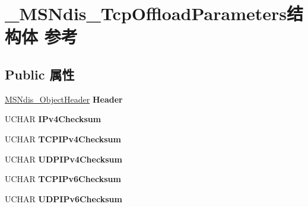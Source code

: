 \hypertarget{struct___m_s_ndis___tcp_offload_parameters}{}\section{\+\_\+\+M\+S\+Ndis\+\_\+\+Tcp\+Offload\+Parameters结构体 参考}
\label{struct___m_s_ndis___tcp_offload_parameters}
\subsection*{Public 属性}
\begin{DoxyCompactItemize}
\item 
\mbox{\label{struct___m_s_ndis___tcp_offload_parameters_a3f03ed32004bb62f56e9cc13d1530537}} 
\hyperlink{struct___m_s_ndis___object_header}{M\+S\+Ndis\+\_\+\+Object\+Header} {\bfseries Header}
\item 
\mbox{\label{struct___m_s_ndis___tcp_offload_parameters_a4287e385a014cc646cd56e17527db5de}} 
U\+C\+H\+AR {\bfseries I\+Pv4\+Checksum}
\item 
\mbox{\label{struct___m_s_ndis___tcp_offload_parameters_ae5c03e345e74ea273ef8cee0c6a07a78}} 
U\+C\+H\+AR {\bfseries T\+C\+P\+I\+Pv4\+Checksum}
\item 
\mbox{\label{struct___m_s_ndis___tcp_offload_parameters_ad1e7b89fd60b825ffa9926c659aa4bd5}} 
U\+C\+H\+AR {\bfseries U\+D\+P\+I\+Pv4\+Checksum}
\item 
\mbox{\label{struct___m_s_ndis___tcp_offload_parameters_a49582dcb34ac82937ec789434b4b35d0}} 
U\+C\+H\+AR {\bfseries T\+C\+P\+I\+Pv6\+Checksum}
\item 
\mbox{\label{struct___m_s_ndis___tcp_offload_parameters_a06052cbf4eed251141af3aac36dda10e}} 
U\+C\+H\+AR {\bfseries U\+D\+P\+I\+Pv6\+Checksum}
\item 
\mbox{\label{struct___m_s_ndis___tcp_offload_parameters_a963fc7ad6c76c25b640d219150b1b60c}} 

\end{DoxyCompactItemize}

